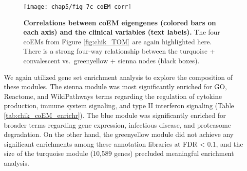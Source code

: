 \begin{table*}[p]
  
\end{table*}

\begin{figure}[htb]
  \centering
  \texttt{[image: chap5/fig\_7c\_coEM\_corr]}
  \caption[Correlations between coexpression modules and clinical variables]{
  \textbf{Correlations between coEM eigengenes (colored bars on each axis) and the clinical variables (text labels).} The four coEMs from Figure \ref{fig:chik_TOM} are again highlighted here. There is a strong four-way relationship between the turquoise + convalescent vs.\ greenyellow + sienna nodes (black boxes). 
  }
  \label{fig:coEM_corr}
\end{figure}

We again utilized gene set enrichment analysis to explore the composition of these modules. The sienna module was most significantly enriched for GO, Reactome, and WikiPathways terms regarding the regulation of cytokine production, immune system signaling, and type II interferon signaling (Table \ref{tab:chik_coEM_enrichr}). The blue module was significantly enriched for broader terms regarding gene expression, infectious disease, and proteasome degradation. On the other hand, the greenyellow module did not achieve any significant enrichments among these annotation libraries at FDR < 0.1, and the size of the turquoise module (10,589 genes) precluded meaningful enrichment analysis.


